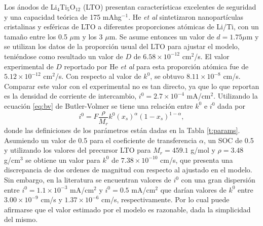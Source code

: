 Los ánodos de Li$_4$Ti$_5$O$_{12}$ (LTO) presentan características excelentes
de seguridad y una capacidad teórica de 175 mAhg$^{-1}$. He \textit{et al} 
\cite{he2012} sintetizaron nanopartículas cristalinas y esféricas de LTO a 
diferentes proporciones atómicas de Li/Ti, con un tamaño entre los 0.5 $\mu$m 
y los 3 $\mu$m. Se asume entonces un valor de $d=1.75 \mu$m y se utilizan los
datos de la proporción usual del LTO para ajustar el modelo, teniéndose como 
resultado un valor de $D$ de $6.58\times10^{-12}$ cm$^2$/s. El valor experimental 
de $D$ reportado por He \textit{et al} para esta proporción atómica fue de
$5.12\times10^{-12}$ cm$^2$/s. Con respecto al valor de $k^0$, se obtuvo 
$8.11\times10^{-8}$ cm/s. Comparar este valor con el experimental no es tan 
directo, ya que lo que reportan es la densidad de corriente de intercambio, 
$i^0 = 2.7\times10^{-4}$ mA/cm$^2$. Utilizando la ecuación \ref{eq:bv} de 
Butler-Volmer se tiene una relación entre $k^0$ e $i^0$ dada por
\begin{equation}\label{eq:i0k0}
    i^0 = F \frac{\rho}{M_r} k^0 \left(x_s\right)^{\alpha} \left(1 - x_s\right)^{1-\alpha},
\end{equation}
donde las definiciones de los parámetros están dadas en la Tabla \ref{t:params}.
Asumiendo un valor de 0.5 para el coeficiente de transferencia $\alpha$, un 
SOC de 0.5 y utilizando los valores del precursor LTO para $M_r = 459.1$ g/mol y
$\rho = 3.48$ g/cm$^3$ \cite{osti_1284125} se obtiene un valor para $k^0$ de
$7.38\times10^{-10}$ cm/s, que presenta una discrepancia de dos ordenes de 
magnitud con respecto al ajustado en el modelo. Sin embargo, en la literatura
se encuentran valores de $i^0$ con una gran dispersión entre 
$i^0 = 1.1\times10^{-3}$ mA/cm$^2$ \cite{medina2015} y $i^0 = 0.5$ mA/cm$^2$ 
\cite{umirov2019} que darían valores de $k^0$ entre $3.00\times10^{-9}$ cm/s y 
$1.37\times10^{-6}$ cm/s, respectivamente. Por lo cual puede afirmarse que el 
valor estimado por el modelo es razonable, dada la simplicidad del mismo.

